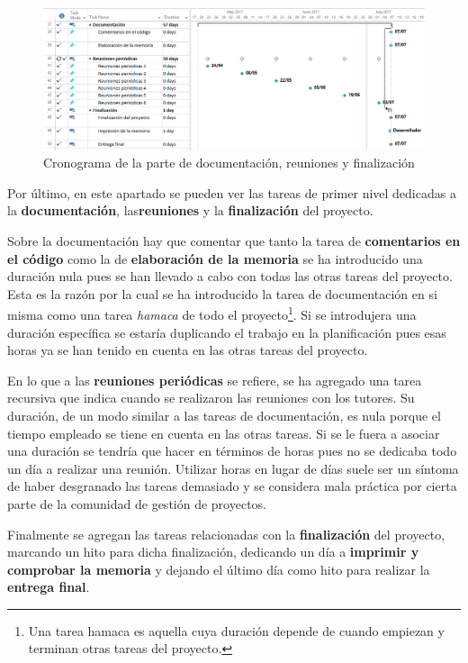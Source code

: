 \begin{figure}
	\centerline{\includegraphics[width=19cm]{otros/capturasPlanificacion/documentacion_reuniones_final.PNG}}
	\caption{Cronograma de la parte de documentación, reuniones y finalización}
	\label{plan:fin}
\end{figure}

Por último, en este apartado se pueden ver las tareas de primer nivel dedicadas a la \textbf{documentación}, las\textbf{reuniones} y la \textbf{finalización} del proyecto.

\bigskip

Sobre la documentación hay que comentar que tanto la tarea de \textbf{comentarios en el código} como la de \textbf{elaboración de la memoria} se ha introducido una duración nula pues se han llevado a cabo con todas las otras tareas del proyecto. Esta es la razón por la cual se ha introducido la tarea de documentación en si misma como una tarea \textit{hamaca} de todo el proyecto\footnote{Una tarea hamaca es aquella cuya duración depende de cuando empiezan y terminan otras tareas del proyecto.}. Si se introdujera una duración específica se estaría duplicando el trabajo en la planificación pues esas horas ya se han tenido en cuenta en las otras tareas del proyecto.

\bigskip

En lo que a las \textbf{reuniones periódicas} se refiere, se ha agregado una tarea recursiva que indica cuando se realizaron las reuniones con los tutores. Su duración, de un modo similar a las tareas de documentación, es nula porque el tiempo empleado se tiene en cuenta en las otras tareas. Si se le fuera a asociar una duración se tendría que hacer en términos de horas pues no se dedicaba todo un día a realizar una reunión. Utilizar horas en lugar de días suele ser un síntoma de haber desgranado las tareas demasiado y se considera mala práctica por cierta parte de la comunidad de gestión de proyectos.

\bigskip

Finalmente se agregan las tareas relacionadas con la \textbf{finalización} del proyecto, marcando un hito para dicha finalización, dedicando un día a \textbf{imprimir y comprobar la memoria} y dejando el último día como hito para realizar la \textbf{entrega final}.



